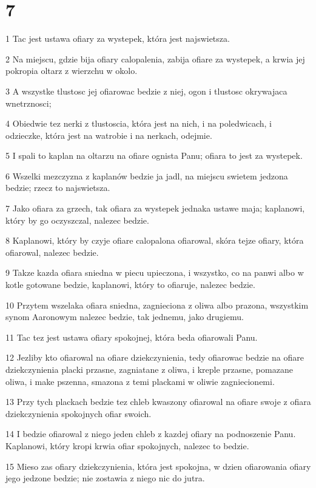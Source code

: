 \chapter{7}

\par 1 Tac jest ustawa ofiary za wystepek, która jest najswietsza.
\par 2 Na miejscu, gdzie bija ofiary calopalenia, zabija ofiare za wystepek, a krwia jej pokropia oltarz z wierzchu w okolo.
\par 3 A wszystke tlustosc jej ofiarowac bedzie z niej, ogon i tlustosc okrywajaca wnetrznosci;
\par 4 Obiedwie tez nerki z tlustoscia, która jest na nich, i na poledwicach, i odzieczke, która jest na watrobie i na nerkach, odejmie.
\par 5 I spali to kaplan na oltarzu na ofiare ognista Panu; ofiara to jest za wystepek.
\par 6 Wszelki mezczyzna z kaplanów bedzie ja jadl, na miejscu swietem jedzona bedzie; rzecz to najswietsza.
\par 7 Jako ofiara za grzech, tak ofiara za wystepek jednaka ustawe maja; kaplanowi, który by go oczyszczal, nalezec bedzie.
\par 8 Kaplanowi, który by czyje ofiare calopalona ofiarowal, skóra tejze ofiary, która ofiarowal, nalezec bedzie.
\par 9 Takze kazda ofiara sniedna w piecu upieczona, i wszystko, co na panwi albo w kotle gotowane bedzie, kaplanowi, który to ofiaruje, nalezec bedzie.
\par 10 Przytem wszelaka ofiara sniedna, zagnieciona z oliwa albo prazona, wszystkim synom Aaronowym nalezec bedzie, tak jednemu, jako drugiemu.
\par 11 Tac tez jest ustawa ofiary spokojnej, która beda ofiarowali Panu.
\par 12 Jezliby kto ofiarowal na ofiare dziekczynienia, tedy ofiarowac bedzie na ofiare dziekczynienia placki przasne, zagniatane z oliwa, i kreple przasne, pomazane oliwa, i make pszenna, smazona z temi plackami w oliwie zagniecionemi.
\par 13 Przy tych plackach bedzie tez chleb kwaszony ofiarowal na ofiare swoje z ofiara dziekczynienia spokojnych ofiar swoich.
\par 14 I bedzie ofiarowal z niego jeden chleb z kazdej ofiary na podnoszenie Panu. Kaplanowi, który kropi krwia ofiar spokojnych, nalezec to bedzie.
\par 15 Mieso zas ofiary dziekczynienia, która jest spokojna, w dzien ofiarowania ofiary jego jedzone bedzie; nie zostawia z niego nic do jutra.
